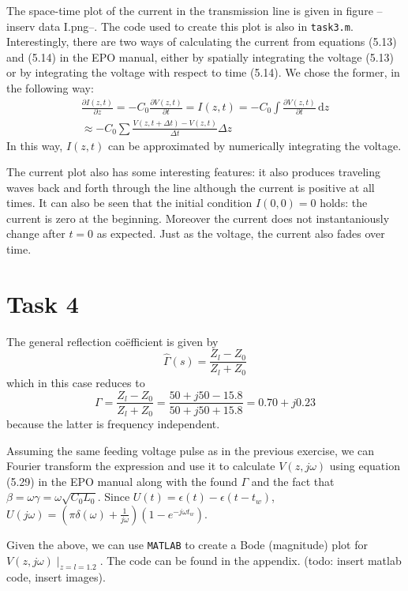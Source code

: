 \documentclass[11pt,titlepage]{report}
\begin{document}
The space-time plot of the current in the transmission line is given in figure --inserv data I.png--. The code used to create this plot is also in \texttt{task3.m}. Interestingly, there are two ways of calculating the current from equations (5.13) and (5.14) in the EPO manual, either by spatially integrating the voltage (5.13) or by integrating the voltage with respect to time (5.14). We chose the former, in the following way:
\begin{eqnarray}
\frac{\partial I(z,t)}{\partial z}=-C_0\frac{\partial V(z,t)}{\partial t} = I(z,t)=-C_0\int \! \frac{\partial V(z,t)}{\partial t}\, \mathrm{d}z \\
\approx -C_0\sum\frac{V(z,t+\Delta t)-V(z,t)}{\Delta t}\Delta z
\end{eqnarray}
In this way, $I(z,t)$ can be approximated by numerically integrating the voltage. 

The current plot also has some interesting features: it also produces traveling waves back and forth through the line although the current is positive at all times. It can also be seen that the initial condition $I(0,0)=0$ holds: the current is zero at the beginning. Moreover the current does not instantaniously change after $t=0$ as expected. Just as the voltage, the current also fades over time.

\section{Task 4}
The general reflection co\"efficient is given by 
\begin{equation}
\hat{\Gamma}(s)=\frac{Z_l-Z_0}{Z_l+Z_0}
\end{equation}
which in this case reduces to
\begin{equation}
\Gamma = \frac{Z_l-Z_0}{Z_l+Z_0}=\frac{50+j50-15.8}{50+j50+15.8}=0.70+j0.23
\end{equation}
because the latter is frequency independent.

Assuming the same feeding voltage pulse as in the previous exercise, we can Fourier transform the expression and use it to calculate $V(z,j\omega)$ using equation (5.29) in the EPO manual along with the found $\Gamma$ and the fact that $\beta=\omega\gamma=\omega\sqrt{C_0L_0}$. Since $U(t)=\epsilon(t)-\epsilon(t-t_w)$, $U(j\omega)=(\pi\delta(\omega)+\frac{1}{j\omega})(1-e^{-j\omega t_w})$.

Given the above, we can use \texttt{MATLAB} to create a Bode (magnitude) plot for $V(z,j\omega)\mid_{z=l=1.2}$. The code can be found in the appendix. (todo: insert matlab code, insert images). 
\end{document}
